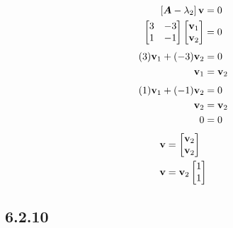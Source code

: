 \documentclass{article}
\begin{document}
\begin{align*}
	\left[ \matr{A} - \lambda_2 \right] \vect{v} & = 0 \\
	\begin{bmatrix}
		3 & -3 \\
		1 & -1
	\end{bmatrix}
	\begin{bmatrix} \vect{v}_1 \\ \vect{v}_2 \end{bmatrix} & = 0
\end{align*}
\begin{align*}
	(3)\vect{v}_1 + (-3)\vect{v}_2 & = 0 \\
	\vect{v}_1 & = \vect{v}_2
\end{align*}
\begin{align*}
	(1)\vect{v}_1 + (-1)\vect{v}_2 & = 0 \\
	\vect{v}_2 & = \vect{v}_2 \\
	0 & = 0
\end{align*}
\begin{align*}
	\vect{v} & = \begin{bmatrix} \vect{v}_2 \\ \vect{v}_2 \end{bmatrix} \\
	\vect{v} & = \vect{v}_2 \begin{bmatrix} 1 \\ 1 \end{bmatrix}
\end{align*}

\subsection{6.2.10}
\end{document}
